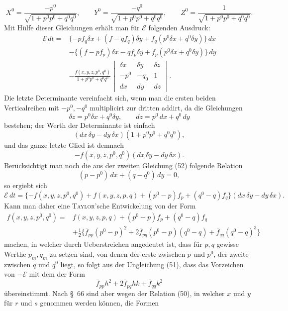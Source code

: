 \documentclass[11pt,a4paper,leqno]{article}
\begin{document}
\[
X^0=\frac{-p^0}{\sqrt{1+p^0p^0+q^0q^0}},\qquad
Y^0=\frac{-q^0}{\sqrt{1+p^0p^0+q^0q^0}},\qquad
Z^0=\frac{1}{\sqrt{1+p^0p^0+q^0q^0}}.
\]
Mit Hülfe dieser Gleichungen erhält man für $\mathcal{E}$ folgenden Ausdruck:
\[
\begin{aligned}
\mathcal{E}\,dt={}&
\{-pf_q\delta x+(f-qf_q)\delta y+f_q(p^0\delta x+q^0\delta y)\}\,dx\\
&-\{(f-pf_p)\delta x-qf_p\delta y+f_p(p^0\delta x+q^0\delta y)\}\,dy\\
&-\frac{f(x,y,z,p^0,q^0)}{1+p^0p^0+q^0q^0}
\begin{vmatrix}
\delta x&\delta y&\delta z\\ -p^0&-q_0&1\\ dx&dy&dz
\end{vmatrix}.
\end{aligned}
\]
Die letzte Determinante vereinfacht sich, wenn man die ersten beiden
Verticalreihen mit $-p^0,-q^0$ multiplicirt zur dritten addirt, da die
Gleichungen
\begin{equation}\tag{52}
\delta z=p^0\delta x+q^0\delta y,\qquad dz=p^0\,dx+q^0\,dy
\end{equation}
bestehen; der Werth der Determinante ist einfach
\[
(dx\,\delta y-dy\,\delta x)(1+p^0p^0+q^0q^0),
\]
und das ganze letzte Glied ist demnach
\[
-f(x,y,z,p^0,q^0)(dx\,\delta y-dy\,\delta x).
\]
Berücksichtigt man noch die aus der zweiten Gleichung (52) folgende Relation
\[
(p-p^0)\,dx+(q-q^0)\,dy=0,
\]
so ergiebt sich
\[
\mathcal{E}\,dt=\{-f(x,y,z,p^0,q^0)+f(x,y,z,p,q)
+(p^0-p)f_p+(q^0-q)f_q\}(dx\,\delta y-dy\,\delta x).
\]
Kann man daher eine \textsc{Taylor}'sche Entwickelung von der Form
\[
\begin{aligned}
f(x,y,z,p^0,q^0)={}&f(x,y,z,p,q)+(p^0-p)f_p+(q^0-q)f_q\\
&+\frac12\{\bar f_{pp}(p^0-p)^2
+2\bar f_{pq}(p^0-p)(q^0-q)+\bar f_{qq}(q^0-q)^3\}
\end{aligned}
\]
machen, in welcher durch Ueberstreichen angedeutet ist, dass für $p,q$
gewisse Werthe $p_m,q_m$ zu setzen sind, von denen der erste zwischen $p$
und $p^0$, der zweite zwischen $q$ und $q^0$ liegt, so folgt aus der
Ungleichung (51), dass das Vorzeichen von $-\mathcal{E}$ mit dem der Form
\[
\bar f_{pp}h^2+2\bar f_{pq}hk+\bar f_{qq}k^2
\]
übereinstimmt. Nach \S~66 sind aber wegen der Relation (50), in welcher $x$
und $y$ für $r$ und $s$ genommen werden können, die Formen
\end{document}
